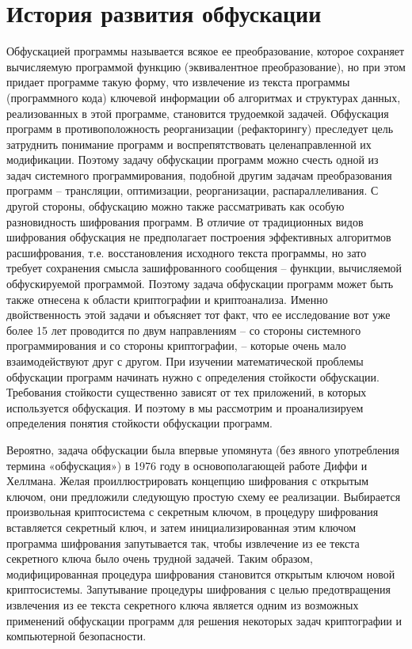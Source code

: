 \newpage
\section{История развития обфускации}

Обфускацией программы называется всякое ее преобразование, которое сохраняет вычисляемую программой функцию (эквивалентное преобразование), но при этом придает программе такую форму, что извлечение из текста программы (программного кода) ключевой информации об алгоритмах и структурах данных, реализованных в этой программе, становится трудоемкой задачей. Обфускация программ в противоположность реорганизации (рефакторингу) преследует цель затруднить понимание программ и воспрепятствовать целенаправленной их модификации. Поэтому задачу обфускации программ можно счесть одной из задач системного программирования, подобной другим задачам преобразования программ -- трансляции, оптимизации, реорганизации, распараллеливания. С другой стороны, обфускацию можно также рассматривать как особую разновидность шифрования программ. В отличие от традиционных видов шифрования обфускация не предполагает построения эффективных алгоритмов расшифрования, т.е. восстановления исходного текста программы, но зато требует сохранения смысла зашифрованного сообщения -- функции, вычисляемой обфускируемой программой. Поэтому задача обфускации программ может быть также отнесена к области криптографии и криптоанализа. Именно двойственность этой задачи и объясняет тот факт, что ее исследование вот уже более 15 лет проводится по двум направлениям -- со стороны системного программирования и со стороны криптографии, -- которые очень мало взаимодействуют друг с другом. При изучении математической проблемы обфускации программ начинать нужно с определения стойкости обфускации. Требования стойкости существенно зависят от тех приложений, в которых используется обфускация. И поэтому в мы рассмотрим и проанализируем определения понятия стойкости обфускации программ.

Вероятно, задача обфускации была впервые упомянута (без явного употребления термина «обфускация») в 1976 году в основополагающей работе Диффи и Хеллмана\cite{Cit1}. Желая проиллюстрировать концепцию шифрования с открытым ключом, они предложили следующую простую схему ее реализации. Выбирается произвольная криптосистема с секретным ключом, в процедуру шифрования вставляется секретный ключ, и затем инициализированная этим ключом программа шифрования запутывается так, чтобы извлечение из ее текста секретного ключа было очень трудной задачей. Таким образом, модифицированная процедура шифрования становится открытым ключом новой криптосистемы. Запутывание процедуры шифрования с целью предотвращения извлечения из ее текста секретного ключа является одним из возможных применений обфускации программ для решения некоторых задач криптографии и компьютерной безопасности.

